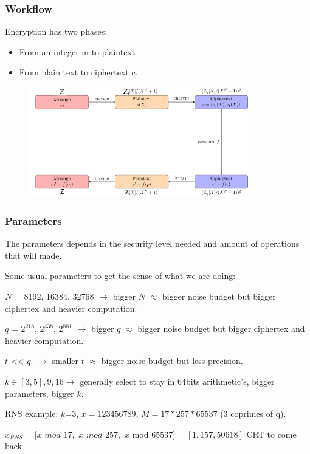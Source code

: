 \documentclass[10pt]{beamer}
\begin{document}
\begin{frame}[noframenumbering]
\frametitle{Workflow}

    Encryption has two phases:
\begin{itemize}
    \item From an integer m to plaintext
    \item From plain text to ciphertext c.
\end{itemize}


\begin{figure}
    \includegraphics[width=0.85\textwidth]{bfv-diagram.png}
\end{figure}


\end{frame}

\begin{frame}[noframenumbering]

\frametitle{Parameters}

The parameters depends in the security level needed and amount of operations that will made.

\vspace{-0.2cm}

Some usual parameters to get the sense of what we are doing:
\vspace{-0.2cm}

$N$ = 8192, 16384, 32768 $\rightarrow$ bigger $N$ $\approx$ bigger noise budget but bigger ciphertex and heavier computation.
\vspace{-0.2cm}

    $q$ = $2^{218}$,   $2^{438}$,  $2^{881}$ $\rightarrow$ bigger $q$ $\approx$ bigger noise budget but bigger ciphertex and heavier computation.
\vspace{-0.2cm}

    $t$  << $q$. $\rightarrow$ smaller $t$ $\approx$ bigger noise budget but less precision.

\vspace{-0.2cm}
    $k\in [3,5], 9, 16 \rightarrow$ generally select to stay in 64bits arithmetic's, bigger parameters, bigger $k$.


\vspace{-0.2cm}
    RNS example: $k$=3, $x=123456789$, $M = 17 * 257 * 65537$ (3 coprimes of q).

\vspace{-0.2cm}
    $x_{RNS} = [x$ $mod$ $17,$ $x$ $mod$ $257,$ $x$ mod $ 65537] = [1, 157, 50618]$ CRT to come back
\end{frame}
\end{document}

